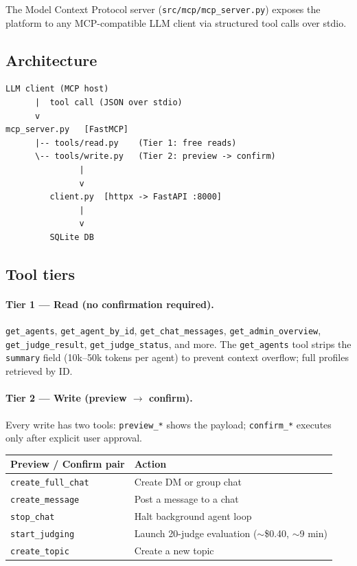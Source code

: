 \documentclass[12pt,a4paper]{article}
\begin{document}
The Model Context Protocol server (\texttt{src/mcp/mcp\_server.py}) exposes the platform
to any MCP-compatible LLM client via structured tool calls over stdio.

\subsection{Architecture}

\begin{lstlisting}[numbers=none,frame=single]
LLM client (MCP host)
      |  tool call (JSON over stdio)
      v
mcp_server.py   [FastMCP]
      |-- tools/read.py    (Tier 1: free reads)
      \-- tools/write.py   (Tier 2: preview -> confirm)
               |
               v
         client.py  [httpx -> FastAPI :8000]
               |
               v
         SQLite DB
\end{lstlisting}

\subsection{Tool tiers}

\paragraph{Tier 1 --- Read (no confirmation required).}
\texttt{get\_agents}, \texttt{get\_agent\_by\_id}, \texttt{get\_chat\_messages},
\texttt{get\_admin\_overview}, \texttt{get\_judge\_result}, \texttt{get\_judge\_status},
and more. The \texttt{get\_agents} tool strips the \texttt{summary} field (10k--50k tokens
per agent) to prevent context overflow; full profiles retrieved by ID.

\paragraph{Tier 2 --- Write (preview $\to$ confirm).}
Every write has two tools: \texttt{preview\_*} shows the payload; \texttt{confirm\_*}
executes only after explicit user approval.

\begin{tabular}{@{}ll@{}}
\toprule
\textbf{Preview / Confirm pair} & \textbf{Action} \\
\midrule
\texttt{create\_full\_chat} & Create DM or group chat \\
\texttt{create\_message}    & Post a message to a chat \\
\texttt{stop\_chat}         & Halt background agent loop \\
\texttt{start\_judging}     & Launch 20-judge evaluation ($\sim$\$0.40, $\sim$9 min) \\
\texttt{create\_topic}      & Create a new topic \\
\bottomrule
\end{tabular}
\end{document}
